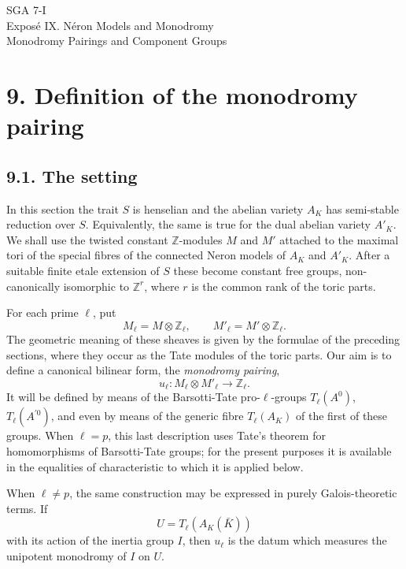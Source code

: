 \documentclass[11pt]{article}
\newcommand{\Z}{\mathbb Z}
\begin{document}
\begin{center}
{\Large SGA 7-I}\\[0.35em]
{\large Exposé IX. Néron Models and Monodromy}\\[0.35em]
{\large Monodromy Pairings and Component Groups}
\end{center}

\section*{9. Definition of the monodromy pairing}

\subsection*{9.1. The setting}
In this section the trait \(S\) is henselian and the abelian variety \(A_K\) has semi-stable reduction over \(S\).  Equivalently, the same is true for the dual abelian variety \(A'_K\).  We shall use the twisted constant \(\Z\)-modules \(M\) and \(M'\) attached to the maximal tori of the special fibres of the connected Neron models of \(A_K\) and \(A'_K\).  After a suitable finite etale extension of \(S\) these become constant free groups, non-canonically isomorphic to \(\Z^r\), where \(r\) is the common rank of the toric parts.

For each prime \(\ell\), put
\begin{equation}\tag{9.1.1}
        M_\ell=M\otimes\Z_\ell,\qquad M'_\ell=M'\otimes\Z_\ell.
\end{equation}
The geometric meaning of these sheaves is given by the formulae of the preceding sections, where they occur as the Tate modules of the toric parts.  Our aim is to define a canonical bilinear form, the \emph{monodromy pairing},
\begin{equation}\tag{9.1.2}
        u_\ell:M_\ell\otimes M'_\ell\longrightarrow \Z_\ell .
\end{equation}
It will be defined by means of the Barsotti-Tate pro-\(\ell\)-groups \(T_\ell(A^0)\), \(T_\ell(A^{\prime 0})\), and even by means of the generic fibre \(T_\ell(A_K)\) of the first of these groups.  When \(\ell=p\), this last description uses Tate's theorem for homomorphisms of Barsotti-Tate groups; for the present purposes it is available in the equalities of characteristic to which it is applied below.

When \(\ell\ne p\), the same construction may be expressed in purely Galois-theoretic terms.  If
\begin{equation}\tag{9.1.3}
        U=T_\ell(A_K(\bar K))
\end{equation}
with its action of the inertia group \(I\), then \(u_\ell\) is the datum which measures the unipotent monodromy of \(I\) on \(U\).
\end{document}
